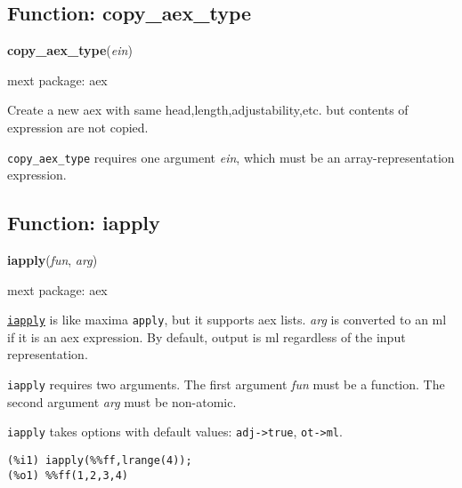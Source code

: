 \documentclass[]{article}
\begin{document}
\vspace{5 pt}


\subsection{Function: copy\_aex\_type\label{sec:copy_aex_type}}
\hypertarget{copy_aex_type}{}
{\bf copy\_aex\_type}({\it ein})


\noindent mext package: aex



\vspace{5 pt}
Create a new aex with same head,length,adjustability,etc. but contents of expression are not copied. 

\vspace{5 pt}

   {\tt copy\_aex\_type} requires one argument {\it ein}, which must be an array-representation expression.


\vspace{5 pt}


\subsection{Function: iapply\label{sec:iapply}}
\hypertarget{iapply}{}
{\bf iapply}({\it fun}, {\it arg})


\noindent mext package: aex



\vspace{5 pt}
\hyperlink{iapply}{{\tt iapply}} is like maxima {\tt apply}, but it supports aex lists. {\it arg} is converted to an ml if it is an aex expression. By default, output is ml regardless of the input representation. 

\vspace{5 pt}

   {\tt iapply} requires two arguments.
    The first argument {\it fun} must be a function.
    The second argument {\it arg} must be non-atomic.


\vspace{5 pt}

{\tt iapply} takes options with default values: {\tt adj->true}, {\tt ot->ml}.
\vspace{5 pt}


\begin{Verbatim}[frame=single]
(%i1) iapply(%%ff,lrange(4));
(%o1) %%ff(1,2,3,4)
\end{Verbatim}
\end{document}
